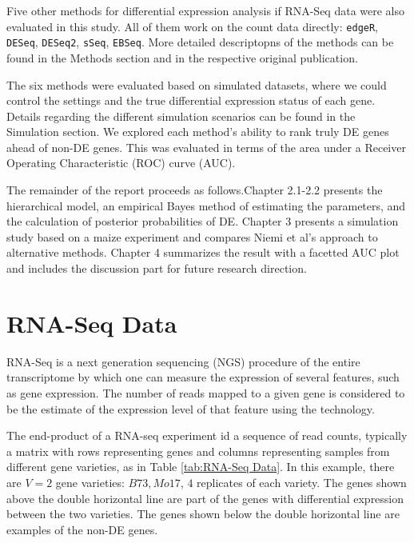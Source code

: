 Five other methods for differential expression analysis if RNA-Seq data were also evaluated in this study. All of them work on the count data directly: {\tt edgeR}\citep{robinson2010edger}, {\tt DESeq}\citep{anders2010differential}, {\tt DESeq2}\cite{love2014moderated}, {\tt sSeq}\citep{yu2013sseq}, {\tt EBSeq}\citep{leng2013ebseq}. More detailed descriptopns of the methods can be found in the Methods section and in the respective original publication. 

The six methods were evaluated based on simulated datasets, where we could control the settings and the true differential expression status of each gene. Details regarding the different simulation scenarios can be found in the Simulation section. We explored each method's ability to rank truly DE genes ahead of non-DE genes. This was evaluated in terms of the area under a Receiver Operating Characteristic (ROC) curve (AUC). 

The remainder of the report proceeds as follows.Chapter 2.1-2.2 presents the hierarchical model, an empirical Bayes method of estimating the parameters, and the calculation of posterior probabilities of DE. Chapter 3 presents a simulation study based on a maize experiment and compares Niemi et al's approach to alternative methods. Chapter 4 summarizes the result with a facetted AUC plot and includes the discussion part for future research direction. 


\section{RNA-Seq Data}

RNA-Seq is a next generation sequencing (NGS) procedure of the entire transcriptome by which one can measure the expression of several features, such as gene expression. The number of reads mapped to a given gene is considered to be the estimate of the expression level of that feature using the technology\citep{marioni2008rna}.

The end-product of a RNA-seq experiment id a sequence of read counts, typically a matrix with rows representing genes and columns representing samples from different gene varieties, as in Table \ref{tab:RNA-Seq Data}. In this example, there are $V=2$ gene varieties: $B73, Mo17$, $4$ replicates of each variety. The genes shown above the double horizontal line are part of the genes with differential expression between the two varieties. The genes shown below the double horizontal line are examples of the non-DE genes. 

